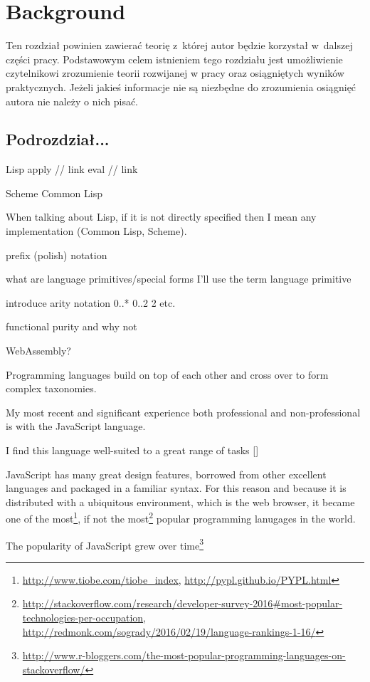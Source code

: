\chapter{Background}\label{chap:background}
Ten rozdział powinien zawierać teorię z~której autor będzie korzystał w~dalszej
części pracy.  Podstawowym celem istnieniem tego rozdziału jest umożliwienie
czytelnikowi zrozumienie teorii rozwijanej w pracy oraz osiągniętych wyników
praktycznych.  Jeżeli jakieś informacje nie są niezbędne do zrozumienia
osiągnięć autora nie należy o nich pisać.

\section{Podrozdział...}

Lisp
    apply // link
    eval // link
    
    Scheme
    Common Lisp

When talking about Lisp, if it is not directly specified then I mean any implementation (Common Lisp, Scheme).

prefix (polish) notation

what are language primitives/special forms
I'll use the term language primitive

introduce arity notation
0..*
0..2
2
etc.

functional purity and why not

WebAssembly?

Programming languages build on top of each other and cross over to form complex taxonomies.

My most recent and significant experience both professional and non-professional is with the JavaScript language.

I find this language well-suited to a great range of tasks []

JavaScript has many great design features, borrowed from other excellent languages and packaged in a familiar syntax. For this reason and because it is distributed with a ubiquitous environment, which is the web browser, it became one of the most\footnote{\url{http://www.tiobe.com/tiobe_index}, \url{http://pypl.github.io/PYPL.html}}, if not the most\footnote{\url{http://stackoverflow.com/research/developer-survey-2016\#most-popular-technologies-per-occupation}, \url{http://redmonk.com/sogrady/2016/02/19/language-rankings-1-16/}} popular programming lanugages in the world.

The popularity of JavaScript grew over time\footnote{\url{http://www.r-bloggers.com/the-most-popular-programming-languages-on-stackoverflow/}}

